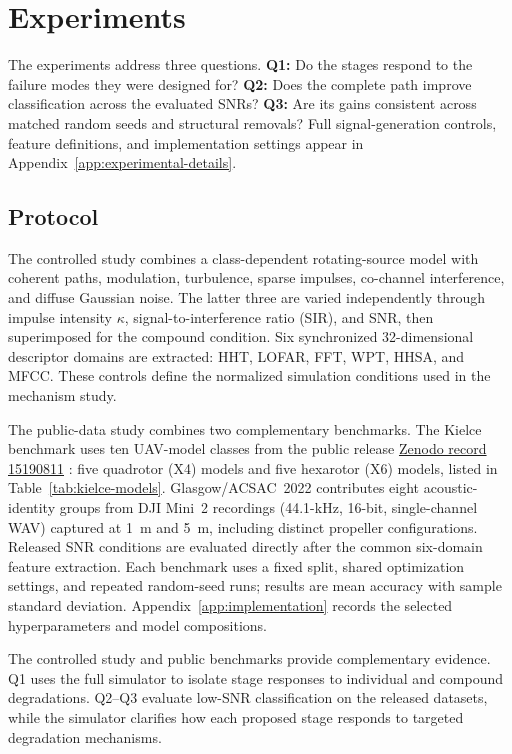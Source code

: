 \section{Experiments}

The experiments address three questions. \textbf{Q1:} Do the stages respond to the failure modes they were designed for? \textbf{Q2:} Does the complete path improve classification across the evaluated SNRs? \textbf{Q3:} Are its gains consistent across matched random seeds and structural removals? Full signal-generation controls, feature definitions, and implementation settings appear in Appendix~\ref{app:experimental-details}.

\subsection{Protocol}
The controlled study combines a class-dependent rotating-source model with coherent paths, modulation, turbulence, sparse impulses, co-channel interference, and diffuse Gaussian noise. The latter three are varied independently through impulse intensity $\kappa$, signal-to-interference ratio (SIR), and SNR, then superimposed for the compound condition. Six synchronized 32-dimensional descriptor domains are extracted: HHT, LOFAR, FFT, WPT, HHSA, and MFCC. These controls define the normalized simulation conditions used in the mechanism study.

The public-data study combines two complementary benchmarks. The Kielce benchmark uses ten UAV-model classes from the public release \href{https://zenodo.org/records/15190811}{Zenodo record 15190811} \citep{miesikowska2023uavdataset}: five quadrotor (X4) models and five hexarotor (X6) models, listed in Table~\ref{tab:kielce-models}. Glasgow/ACSAC~2022 \citep{diao2022drone} contributes eight acoustic-identity groups from DJI Mini~2 recordings (44.1-kHz, 16-bit, single-channel WAV) captured at 1~m and 5~m, including distinct propeller configurations. Released SNR conditions are evaluated directly after the common six-domain feature extraction. Each benchmark uses a fixed split, shared optimization settings, and repeated random-seed runs; results are mean accuracy with sample standard deviation. Appendix~\ref{app:implementation} records the selected hyperparameters and model compositions.

The controlled study and public benchmarks provide complementary evidence. Q1 uses the full simulator to isolate stage responses to individual and compound degradations. Q2--Q3 evaluate low-SNR classification on the released datasets, while the simulator clarifies how each proposed stage responds to targeted degradation mechanisms.

